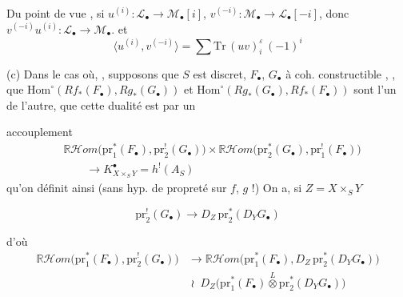 \documentclass[11pt,a4paper]{article}
\begin{document}
Du point de vue , si $u^{(i)} : \mathcal{L}_\bullet \to \mathcal{M}_\bullet[i]$, $v^{(-i)} : \mathcal{M}_\bullet \to \mathcal{L}_\bullet[-i]$, donc \struck{\ill{}} $v^{(-i)}u^{(i)} : \mathcal{L}_\bullet \to \mathcal{M}_\bullet$.
et
\[
\langle u^{(i)}, v^{(-i)}\rangle = \sum \mathrm{Tr}\,(uv)^{\varepsilon}_i\,(-1)^i
\]

(c) Dans le cas où, , supposons que $S$ est  discret, $F_\bullet$, $G_\bullet$ à coh. constructible  \struck{\ill{}}, , 
que $\mathrm{Hom}^{\circ}(Rf_*(F_\bullet), Rg_*(G_\bullet))$ et $\mathrm{Hom}^{\circ}(Rg_*(G_\bullet), Rf_*(F_\bullet))$  sont  l'un de l'autre,    que cette dualité est  par un

accouplement
\[
\begin{aligned}
&\mathbb{R}\mathcal{H}om\bigl(\mathrm{pr}_1^*(F_\bullet), \mathrm{pr}_2^!(G_\bullet)\bigr) \times \mathbb{R}\mathcal{H}om\bigl(\mathrm{pr}_2^*(G_\bullet), \mathrm{pr}_1^!(F_\bullet)\bigr)\\
&\qquad\longrightarrow K^\bullet_{X\times_S Y} = h^!(A_S)
\end{aligned}
\]
qu'on définit ainsi (sans hyp. de propreté sur $f$, $g$ !) On a, si $Z = X\times_S Y$

\[
\mathrm{pr}_2^!(G_\bullet) \longrightarrow D_Z\,\mathrm{pr}_2^*(D_Y G_\bullet)
\]

d'où
\[
\begin{aligned}
\mathbb{R}\mathcal{H}om\bigl(\mathrm{pr}_1^*(F_\bullet), \mathrm{pr}_2^!(G_\bullet)\bigr) &\longrightarrow \mathbb{R}\mathcal{H}om\bigl(\mathrm{pr}_1^*(F_\bullet), D_Z\,\mathrm{pr}_2^*(D_Y G_\bullet)\bigr)\\
&\;\wr\;\; D_Z\bigl(\mathrm{pr}_1^*(F_\bullet)\overset{L}{\otimes}\mathrm{pr}_2^*(D_Y G_\bullet)\bigr)
\end{aligned}
\]
\end{document}
